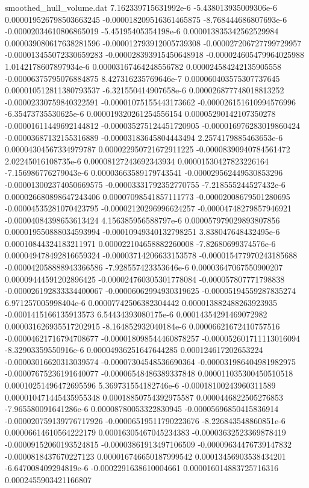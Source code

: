 \begin{filecontents}{smoothed_hull_volume.dat}
7.162339715631992e-6	-5.438013935009306e-6	0.000019526798503663245	-0.000018209516361465875	-8.768444686807693e-6	-0.00002034610806865019	-5.45195405354198e-6	0.000013835342562529984	0.000039080617638281596	-0.000012793912005739308	-0.000027206727799729957	-0.000013455072330659283	-0.000028393915450648918	-0.000024605479964025988	1.0142178607897934e-6	0.00003167464248556782	0.000024584242135905558	-0.00006375795076884875	8.427316235769646e-7	0.000060403575307737645
0.000010512811380793537	-6.321550414907658e-6	0.000026877748018813252	-0.00002330759840322591	-0.00001075155443173662	-0.000026151610994576996	-6.35473735530625e-6	0.000019320261254556154	0.00005290142107350278	-0.00001611449692144812	-0.000035275124451720905	-0.000016976283019860424	-0.00003687132155316889	-0.00003183645804443494	2.2574179885463653e-6	0.00004304567334979787	0.000022950721672911225	-0.00008390940784561472	2.02245016108735e-6	0.00008127243692343934
0.00001530427823226164	-7.156986776279043e-6	0.00003663589179743541	-0.000029562449530853296	-0.000013002374050669575	-0.00003331792352770755	-7.218555244527432e-6	0.000026680898647243406	0.00007098541857111773	-0.00002008679501280695	-0.00004535281070423795	-0.00002120296996624257	-0.00004748279857946921	-0.00004084398653613424	4.156385956588797e-6	0.000057979029893807856	0.000019550888034593994	-0.00010949340132798251	3.838047648432495e-6	0.00010844324183211971
0.000022104658882260008	-7.82680699374576e-6	0.000049478492816659324	-0.00003714206633153578	-0.000015477970243185688	-0.000042058888943366586	-7.928557423353646e-6	0.00003647067550900207	0.00009444591202896425	-0.000024760305301778084	-0.000057807771798838	-0.000026192833334400067	-0.00006062994930319625	-0.00005194559287835274	6.971257005998404e-6	0.00007742506382304442	0.000013882488263923935	-0.0001415166135913573	6.54434393080175e-6	0.00014354291469072982
0.000031626935517202915	-8.164852932040184e-6	0.00006621672410757516	-0.00004621716794708677	-0.000018098544460878257	-0.000052601711113016094	-8.32903359550916e-6	0.00004936251647644285	0.000124617202653224	-0.00003016620313039574	-0.00007304548536690364	-0.000031986404981982975	-0.00007675236191640077	-0.00006548486389337848	0.000011035300450510518	0.00010251496472695596	5.369731554182746e-6	-0.00018100243960311589	0.000010471445435955348	0.00018850754392975587
0.0000446822505276853	-7.965580091641286e-6	0.00008780053322830945	-0.00005696850415836914	-0.000020759139776717926	-0.00006519511790223676	-8.226843548860851e-6	0.00006614610564222179	0.00016305467045234383	-0.00003632523369878419	-0.00009152060193524815	-0.00003861913497106509	-0.00009634476739147832	-0.0000818437670227123	0.000016746650187999542	0.00013456903538434201	-6.647008409294819e-6	-0.0002291638610004661	0.000016014883725716316	0.0002455903421166807

\end{filecontents}
